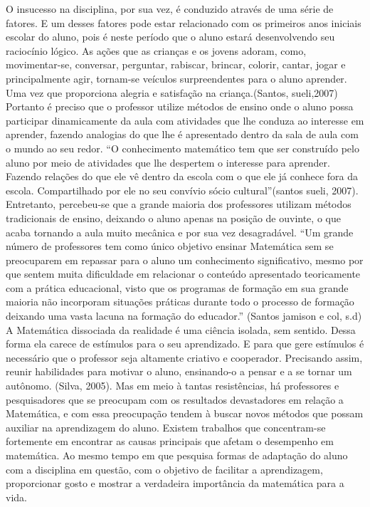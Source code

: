 \documentclass[12pt,a4paper]{article}
\begin{document}
O insucesso na disciplina, por sua vez, é conduzido através de uma série de fatores. E um desses fatores pode estar relacionado com os primeiros anos iniciais escolar do aluno, pois é neste período que o aluno estará desenvolvendo seu raciocínio lógico. As ações que as crianças e os jovens adoram, como, movimentar-se, conversar, perguntar, rabiscar, brincar, colorir, cantar, jogar e principalmente agir, tornam-se veículos surpreendentes para o aluno aprender. Uma vez que proporciona alegria e satisfação na criança.(Santos, sueli,2007) 
Portanto é preciso que o professor utilize métodos de ensino onde o aluno possa participar dinamicamente da aula com atividades que lhe conduza ao interesse em aprender, fazendo analogias do que lhe é apresentado dentro da sala de aula com o mundo ao seu redor.
“O conhecimento matemático tem que ser construído pelo aluno por meio de atividades que                                 lhe despertem o interesse para aprender. Fazendo relações do que ele vê dentro da escola com o que ele já conhece fora da escola. Compartilhado  por ele no seu convívio sócio cultural”(santos sueli, 2007).
Entretanto, percebeu-se que a grande maioria dos professores utilizam métodos tradicionais de ensino, deixando o aluno apenas na posição de ouvinte,  o que acaba tornando a aula muito mecânica e por sua vez desagradável.    
                 “Um grande número de professores tem como único objetivo ensinar Matemática sem se preocuparem em repassar para o aluno um conhecimento significativo, mesmo por que sentem muita dificuldade em relacionar o conteúdo apresentado teoricamente com a prática educacional, visto que os programas de formação em sua grande maioria não incorporam situações práticas durante todo o processo de  formação deixando uma vasta lacuna na formação do educador.” (Santos jamison e  col, s.d)
A Matemática dissociada da realidade é uma ciência isolada, sem sentido. Dessa forma ela carece de estímulos para o seu aprendizado. E para que gere estímulos é necessário que o professor seja altamente criativo e cooperador. Precisando assim, reunir habilidades para motivar o aluno, ensinando-o a pensar e a se tornar um autônomo. (Silva, 2005).
Mas em meio à tantas resistências, há professores e pesquisadores que se preocupam com os resultados devastadores em relação a Matemática, e com essa preocupação tendem à buscar novos métodos que possam auxiliar na aprendizagem do aluno.
Existem trabalhos que concentram-se fortemente em encontrar as causas principais que afetam o desempenho em matemática. Ao mesmo tempo em que pesquisa formas de adaptação do aluno com a disciplina em questão, com o objetivo de facilitar a aprendizagem, proporcionar gosto e mostrar a verdadeira importância da matemática para a vida. 
\end{document}
